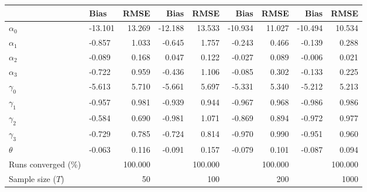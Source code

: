 
\begin{tabular}[t]{llrrrrrrr}
\toprule
  & Bias & RMSE & Bias & RMSE & Bias & RMSE & Bias & RMSE\\
\midrule
$\alpha_{0}$ & -13.101 & 13.269 & -12.188 & 13.533 & -10.934 & 11.027 & -10.494 & 10.534\\
$\alpha_{1}$ & -0.857 & 1.033 & -0.645 & 1.757 & -0.243 & 0.466 & -0.139 & 0.288\\
$\alpha_{2}$ & -0.089 & 0.168 & 0.047 & 0.122 & -0.027 & 0.089 & -0.006 & 0.021\\
$\alpha_{3}$ & -0.722 & 0.959 & -0.436 & 1.106 & -0.085 & 0.302 & -0.133 & 0.225\\
$\gamma_{0}$ & -5.613 & 5.710 & -5.661 & 5.697 & -5.331 & 5.340 & -5.212 & 5.213\\
$\gamma_{1}$ & -0.957 & 0.981 & -0.939 & 0.944 & -0.967 & 0.968 & -0.986 & 0.986\\
$\gamma_{2}$ & -0.584 & 0.690 & -0.981 & 1.071 & -0.869 & 0.894 & -0.972 & 0.977\\
$\gamma_{3}$ & -0.729 & 0.785 & -0.724 & 0.814 & -0.970 & 0.990 & -0.951 & 0.960\\
$\theta$ & -0.063 & 0.116 & -0.091 & 0.157 & -0.079 & 0.101 & -0.087 & 0.094\\
Runs converged (\%) &  & 100.000 &  & 100.000 &  & 100.000 &  & 100.000\\
Sample size ($T$) &  & 50 &  & 100 &  & 200 &  & 1000\\
\bottomrule
\end{tabular}
